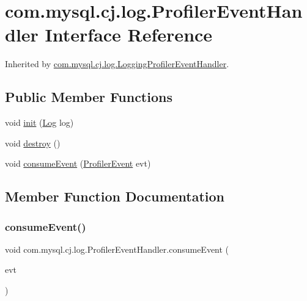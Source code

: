\hypertarget{interfacecom_1_1mysql_1_1cj_1_1log_1_1_profiler_event_handler}{}\section{com.\+mysql.\+cj.\+log.\+Profiler\+Event\+Handler Interface Reference}
\label{interfacecom_1_1mysql_1_1cj_1_1log_1_1_profiler_event_handler}


Inherited by \mbox{\hyperlink{classcom_1_1mysql_1_1cj_1_1log_1_1_logging_profiler_event_handler}{com.\+mysql.\+cj.\+log.\+Logging\+Profiler\+Event\+Handler}}.

\subsection*{Public Member Functions}
\begin{DoxyCompactItemize}
\item 
void \mbox{\hyperlink{interfacecom_1_1mysql_1_1cj_1_1log_1_1_profiler_event_handler_a09601bf613bfb6c51735f6bcbc15ebc7}{init}} (\mbox{\hyperlink{interfacecom_1_1mysql_1_1cj_1_1log_1_1_log}{Log}} log)
\item 
void \mbox{\hyperlink{interfacecom_1_1mysql_1_1cj_1_1log_1_1_profiler_event_handler_a16c177c9284c3767ba723f61946a8632}{destroy}} ()
\item 
void \mbox{\hyperlink{interfacecom_1_1mysql_1_1cj_1_1log_1_1_profiler_event_handler_a5b43ed803ec37646b7f7be0c2b1e6b90}{consume\+Event}} (\mbox{\hyperlink{interfacecom_1_1mysql_1_1cj_1_1log_1_1_profiler_event}{Profiler\+Event}} evt)
\end{DoxyCompactItemize}


\subsection{Member Function Documentation}
\mbox{\label{interfacecom_1_1mysql_1_1cj_1_1log_1_1_profiler_event_handler_a5b43ed803ec37646b7f7be0c2b1e6b90}} 
\subsubsection{\texorpdfstring{consume\+Event()}{consumeEvent()}}
{\footnotesize\ttfamily void com.\+mysql.\+cj.\+log.\+Profiler\+Event\+Handler.\+consume\+Event (\begin{DoxyParamCaption}\item[{\mbox{\hyperlink{interfacecom_1_1mysql_1_1cj_1_1log_1_1_profiler_event}{Profiler\+Event}}}]{evt }\end{DoxyParamCaption})}



